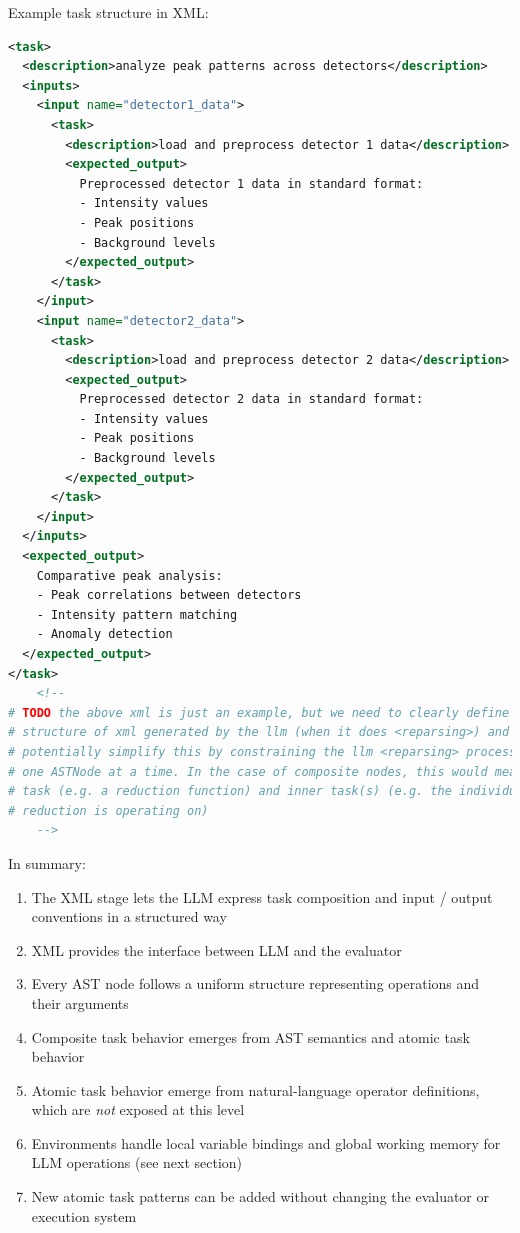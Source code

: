 \documentclass{article}
\begin{document}
Example task structure in XML:
\begin{lstlisting}[language=XML]
<task>
  <description>analyze peak patterns across detectors</description>
  <inputs>
    <input name="detector1_data">
      <task>
        <description>load and preprocess detector 1 data</description>
        <expected_output>
          Preprocessed detector 1 data in standard format:
          - Intensity values
          - Peak positions
          - Background levels
        </expected_output>
      </task>
    </input>
    <input name="detector2_data">
      <task>
        <description>load and preprocess detector 2 data</description>
        <expected_output>
          Preprocessed detector 2 data in standard format:
          - Intensity values
          - Peak positions
          - Background levels
        </expected_output>
      </task>
    </input>
  </inputs>
  <expected_output>
    Comparative peak analysis:
    - Peak correlations between detectors
    - Intensity pattern matching
    - Anomaly detection
  </expected_output>
</task>
    <!--
# TODO the above xml is just an example, but we need to clearly define a mapping between the 
# structure of xml generated by the llm (when it does <reparsing>) and AST subtrees. (We could 
# potentially simplify this by constraining the llm <reparsing> process so that it can only generate 
# one ASTNode at a time. In the case of composite nodes, this would mean generating xml for an outer 
# task (e.g. a reduction function) and inner task(s) (e.g. the individual tasks whose outputs the 
# reduction is operating on)
    -->
\end{lstlisting}

In summary:
\begin{enumerate}
    \item The XML stage lets the LLM express task composition and input / output conventions in a structured way
    \item XML provides the interface between LLM and the evaluator
    \item Every AST node follows a uniform structure representing operations and their arguments
    \item Composite task behavior emerges from AST semantics and atomic task behavior
    \item Atomic task behavior emerge from natural-language operator definitions, which are \emph{not} exposed at this level
    \item Environments handle local variable bindings and global working memory for LLM operations (see next section)
    \item New atomic task patterns can be added without changing the evaluator or execution system
\end{enumerate}
\end{document}
